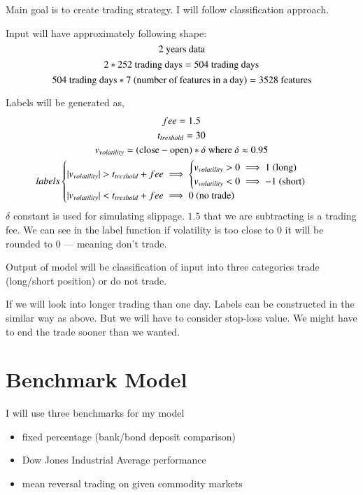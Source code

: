 \documentclass[final,2p]{elsarticle}
\begin{document}
Main goal is to create trading strategy. I will follow classification approach.

Input will have approximately following shape:
\[2 \textup{ years data}\]
\[2*252 \textup{ trading days} = 504\textup{ trading days}\]
\[504\textup{ trading days} * 7 \textup{ (number of features in a day)} = 3528 \textup{ features}\]

Labels will be generated as,
\begin{gather}
    fee = 1.5 \\
    t_{treshold} = 30 \\
    v_{volatility} = (\textup{close} - \textup{open})*\delta \textup{ where } \delta \approx 0.95 \\
    labels
    \begin{cases}
        | v_{volatility} | > t_{treshold} + fee \implies
        \begin{cases}
            v_{volatility} > 0 \implies 1 \textup{ (long)} \\
            v_{volatility} < 0 \implies -1 \textup{ (short)} \\
        \end{cases}\\
        | v_{volatility} | < t_{treshold} + fee \implies 0 \textup{ (no trade)}
    \end{cases}
\end{gather}
$\delta$ constant is used for simulating slippage.
$1.5$ that we are subtracting is a trading fee.
We can see in the label function if volatility is too close to $0$ it will be rounded to $0$ --- meaning don't trade.

Output of model will be classification of input into three categories trade (long/short position) or do not trade.

If we will look into longer trading than one day. Labels can be constructed in the similar way as above. But we will have to consider stop-loss value. We might have to end the trade sooner than we wanted.

\section{Benchmark Model}

I will use three benchmarks for my model

\begin{itemize}
    \item fixed percentage (bank/bond deposit comparison)
    \item Dow Jones Industrial Average performance
    \item mean reversal trading on given commodity markets
\end{itemize}
\end{document}
